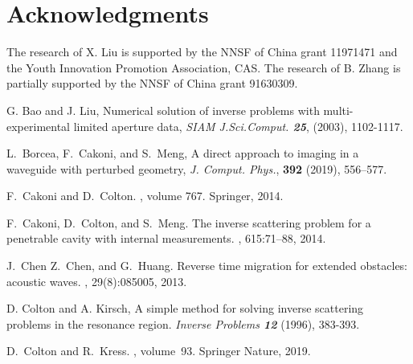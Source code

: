 \documentclass[final]{siamltex}
\begin{document}
\section*{Acknowledgments}
The research of X. Liu is supported by the NNSF of China grant 11971471 and the Youth Innovation Promotion Association, CAS. The research of B. Zhang is partially supported by the NNSF of China grant 91630309.


\begin{thebibliography}{10}


 G. Bao and J. Liu,
	Numerical solution of inverse problems with multi-experimental limited aperture data,
	{\em SIAM J.Sci.Comput. \bf25}, (2003), 1102-1117.
	
{L.~Borcea, F.~Cakoni, and S.~Meng},  {A direct approach to imaging
  in a waveguide with perturbed geometry}, {\em J. Comput. Phys.},
  {\bf 392} (2019), 556--577.
	
F.~Cakoni and D.~Colton.
, volume
  767.
\newblock Springer, 2014.


F.~Cakoni, D.~Colton, and S.~Meng.
\newblock The inverse scattering problem for a penetrable cavity with internal
  measurements.
, 615:71--88, 2014.

J.~Chen  Z.~Chen, and G.~Huang.
\newblock Reverse time migration for extended obstacles: acoustic waves.
, 29(8):085005, 2013.



D. Colton and A. Kirsch, A simple method for solving inverse scattering problems in the resonance region.
{\em Inverse Problems \bf12} (1996), 383-393.

D.~Colton and R.~Kress.
,
  volume~93.
\newblock Springer Nature, 2019.


\end{thebibliography}
\end{document}
